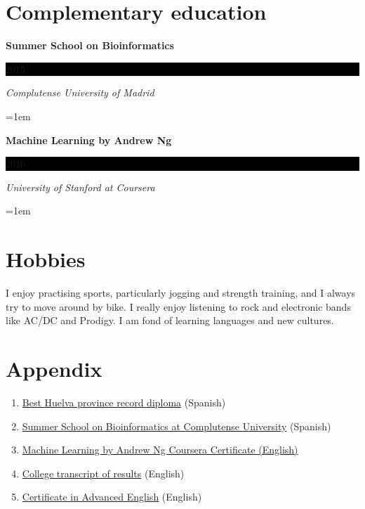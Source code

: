 \documentclass[paper=a4,fontsize=11pt]{article} %
\newlength{\spacebox}
\newcommand{\sepspace}{\vspace*{1em}}		%
\newcommand{\NewPart}[1]{\section*{
									{#1}}}
\newcommand{\PersonalEntry}[2]{
		\noindent\hangindent=2em\hangafter=0 %
		\parbox{\spacebox}{        %
		\textit{#1}}		       %
		\hspace{1.5em} #2 \par}    %
\newcommand{\EducationEntry}[4]{
		\noindent \textbf{#1} \hfill      %
		\colorbox{Black}{%
			\parbox{6em}{%
			\hfill\color{White}#2}} \par  %
		\noindent \textit{#3} \par        %
		\noindent\hangindent=1em\hangafter=0 \small #4 %
		\normalsize \par}
\newcommand{\AwardEntry}[4]{
		\noindent \textbf{#1} \hfill      %
		\colorbox{Black}{%
			\parbox{3em}{%
			\hfill\color{White}#2}} \par  %
		\noindent \textit{#3} \par        %
		  \noindent\hangindent=1em\hangafter=0 \small #4  %
		\normalsize \par}
\newcommand{\VolunteeringEntry}[2]{      %
		\noindent\hangindent=2em\hangafter=0 %
		\parbox{\spacebox}{        %
		\textit{#1}}			   %
		\hspace{1.5em} #2 \par}    %
\begin{document}


  
\NewPart{Complementary education}{}


\AwardEntry{Summer School on Bioinformatics}{2015}{Complutense University of Madrid}{}  
  


\AwardEntry{Machine Learning by Andrew Ng}{2016}{University of Stanford at Coursera}{}






%
%


\NewPart{Hobbies}
I enjoy practising sports, particularly jogging and strength training, and I always try to move around by bike. I really enjoy listening to rock and electronic bands like AC/DC and Prodigy. I am fond of learning languages and new cultures.





\NewPart{Appendix}
\begin{enumerate}


\item \hyperlink{premio_extraordinario}{Best Huelva province record diploma} (Spanish)
\item \hyperlink{complu}{Summer School on Bioinformatics at Complutense University} (Spanish)

\item \hyperlink{ML-Coursera}{Machine Learning by Andrew Ng Coursera Certificate (English)}

\item \hyperlink{exp-en}{College transcript of results} (English)
\item \hyperlink{cae}{Certificate in Advanced English} (English)
\end{enumerate}
%



\end{document}
